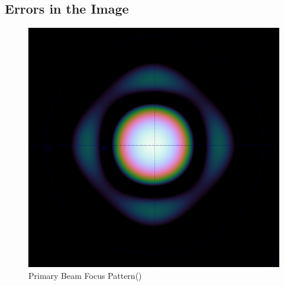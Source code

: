 \subsection{Errors in the Image}\label{int:sec:err}
\begin{figure}[H]
	\centering
	\label{int:fig:beam}
	\includegraphics[scale=0.28]{Images/beam.png}
	\caption{Primary Beam Focus Pattern(\cite{oleg})}
\end{figure}
